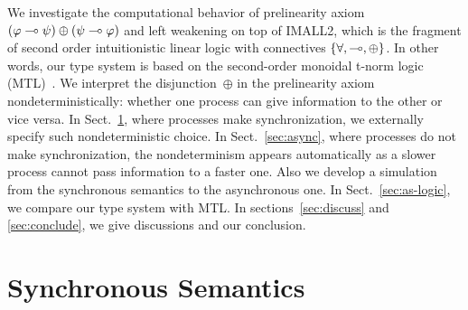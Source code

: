\documentclass[envcountsame]{llncs}
\begin{document}
We investigate the computational behavior of prelinearity axiom
$(\varphi\multimap\psi)\oplus(\psi\multimap\varphi)$ and left weakening
on top of IMALL2, which is the fragment of second order
intuitionistic linear logic with connectives $\{\forall, \multimap,
\oplus\}$.  In other words, our type system is based on the second-order
monoidal t-norm logic (MTL)~\citep{Esteva2001271}.
We interpret the disjunction~$\oplus$ in the prelinearity axiom
nondeterministically: whether
one process can give information to the other or
vice versa.
In Sect.~\ref{sec:sync}, where processes make synchronization,
we externally specify such nondeterministic choice.
In Sect.~\ref{sec:async}, where processes do not make synchronization,
the nondeterminism appears automatically as a slower process cannot pass
information to a faster one.
%
%
Also we
develop a simulation from the synchronous semantics to the
asynchronous one.
In Sect.~\ref{sec:as-logic}, we compare our type system with MTL.
In sections~\ref{sec:discuss} and \ref{sec:conclude}, we give discussions
and our conclusion.

\section{Synchronous Semantics}
\label{sec:sync}
\end{document}
